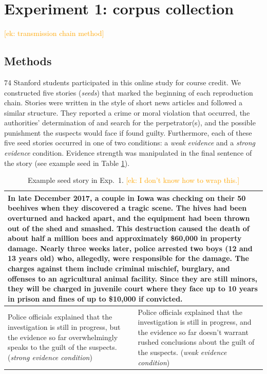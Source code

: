 \documentclass[10pt,letterpaper]{article}
\newcommand{\ek}[1]{\textcolor{Orange}{[ek: #1]}}
\begin{document}
\section{Experiment 1: corpus collection}
\ek{transmission chain method}

\subsection{Methods}
74 Stanford students participated in this online study for course credit. 
We constructed five stories (\textit{seeds}) that marked the beginning of each reproduction chain.  Stories were written in the style of short news articles and followed a similar structure. They reported a crime or moral violation that occurred, the authorities' determination of and search for the perpetrator(s), and  the possible punishment the suspects would face if found guilty. Furthermore, each of these five seed stories occurred in one of two conditions: a \emph{weak evidence} and a \emph{strong evidence} condition. Evidence strength was manipulated in the final sentence of the story (see example seed in Table \ref{tab:examplestory}).

\begin{table}
\caption{Example seed story in Exp.~1. \ek{I don't know how to wrap this.}}
\centering
\begin{tabular}{p{} p{}}
\toprule
\multicolumn{2}{p{\textwidth}}{In late December 2017, a couple in Iowa was checking on their 50 beehives when they discovered a tragic scene. The hives had been overturned and hacked apart, and the equipment had been thrown out of the shed and smashed. This destruction caused the death of about half a million bees and approximately \$60,000 in property damage. Nearly three weeks later, police arrested two boys (12 and 13 years old) who, allegedly, were responsible for the damage. The charges against them include criminal mischief, burglary, and offenses to an agricultural animal facility. Since they are still minors, they will be charged in juvenile court where they face up to 10 years in prison and fines of up to \$10,000 if convicted.}\\
\midrule
Police officials explained that the investigation is still in progress, but the evidence so far overwhelmingly speaks to the guilt of the suspects. (\emph{strong evidence condition}) & Police officials explained that the investigation is still in progress, and the evidence so far doesn't warrant rushed conclusions about the guilt of the suspects. (\emph{weak evidence condition})  \\
\bottomrule
\end{tabular}
\label{tab:examplestory}
\end{table}
\end{document}
